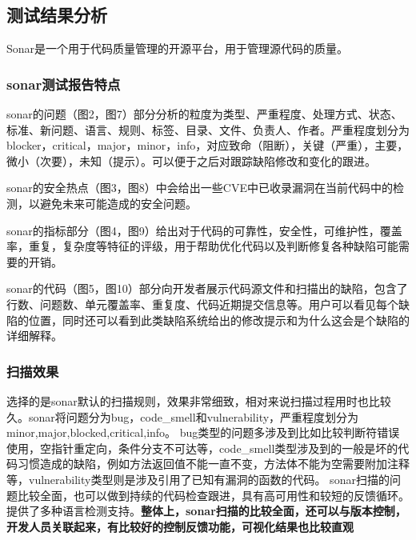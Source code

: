 \documentclass[hyperref, a4paper]{ctexart}
\begin{document}
\hypertarget{ux6d4bux8bd5ux7ed3ux679cux5206ux6790}{%
\subsection{测试结果分析}\label{ux6d4bux8bd5ux7ed3ux679cux5206ux6790}}

Sonar是一个用于代码质量管理的开源平台，用于管理源代码的质量。

\hypertarget{sonarux6d4bux8bd5ux62a5ux544aux7279ux70b9}{%
\subsubsection{sonar测试报告特点}\label{sonarux6d4bux8bd5ux62a5ux544aux7279ux70b9}}

sonar的问题（图2，图7）部分分析的粒度为类型、严重程度、处理方式、状态、标准、新问题、语言、规则、标签、目录、文件、负责人、作者。严重程度划分为blocker，critical，major，minor，info，对应致命（阻断），关键（严重），主要，微小（次要），未知（提示）。可以便于之后对跟踪缺陷修改和变化的跟进。

sonar的安全热点（图3，图8）中会给出一些CVE中已收录漏洞在当前代码中的检测，以避免未来可能造成的安全问题。

sonar的指标部分（图4，图9）给出对于代码的可靠性，安全性，可维护性，覆盖率，重复，复杂度等特征的评级，用于帮助优化代码以及判断修复各种缺陷可能需要的开销。

sonar的代码（图5，图10）部分向开发者展示代码源文件和扫描出的缺陷，包含了行数、问题数、单元覆盖率、重复度、代码近期提交信息等。用户可以看见每个缺陷的位置，同时还可以看到此类缺陷系统给出的修改提示和为什么这会是个缺陷的详细解释。

\hypertarget{ux626bux63cfux6548ux679c}{%
\subsubsection{扫描效果}\label{ux626bux63cfux6548ux679c}}

选择的是sonar默认的扫描规则，效果非常细致，相对来说扫描过程用时也比较久。sonar将问题分为bug，code\_smell和vulnerability，严重程度划分为minor,major,blocked,critical,info。
bug类型的问题多涉及到比如比较判断符错误使用，空指针重定向，条件分支不可达等，code\_smell类型涉及到的一般是坏的代码习惯造成的缺陷，例如方法返回值不能一直不变，方法体不能为空需要附加注释等，vulnerability类型则是涉及引用了已知有漏洞的函数的代码。
sonar扫描的问题比较全面，也可以做到持续的代码检查跟进，具有高可用性和较短的反馈循环。提供了多种语言检测支持。\textbf{整体上，sonar扫描的比较全面，还可以与版本控制，开发人员关联起来，有比较好的控制反馈功能，可视化结果也比较直观}
\end{document}
